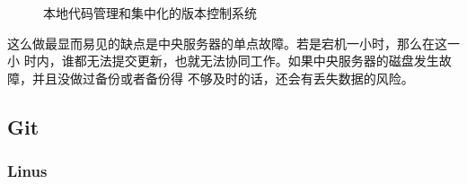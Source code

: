 \documentclass[UTF8]{ctexart}
\begin{document}
\begin{figure}[H] %
    \centering %

    \caption{本地代码管理和集中化的版本控制系统} %
    \label{Fig.svn_interge} %
\end{figure}

这么做最显而易见的缺点是中央服务器的单点故障。若是宕机一小时，那么在这一小
时内，谁都无法提交更新，也就无法协同工作。如果中央服务器的磁盘发生故障，并且没做过备份或者备份得
不够及时的话，还会有丢失数据的风险。


\subsection{Git} %
\label{sub:Git}

\subsubsection{Linus}





\newpage
\end{document}
